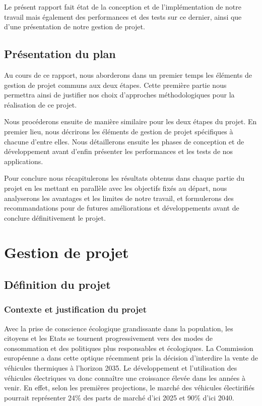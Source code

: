 \documentclass[a4paper, 12pt]{report}
\begin{document}
\bigskip
Le présent rapport fait état de la conception et de l'implémentation de notre travail mais également des performances et des tests sur ce dernier, ainsi que d'une présentation de notre gestion de projet.

\section{Présentation du plan}

Au cours de ce rapport, nous aborderons dans un premier temps les éléments de gestion de projet communs aux deux étapes. Cette première partie nous permettra ainsi de justifier nos choix d'approches méthodologiques pour la réalisation de ce projet.
\bigskip

Nous procéderons ensuite de manière similaire pour les deux étapes du projet. En premier lieu, nous décrirons les éléments de gestion de projet spécifiques à chacune d'entre elles. Nous détaillerons ensuite les phases de conception et de développement avant d'enfin présenter les performances et les tests de nos applications.
\bigskip


Pour conclure nous récapitulerons les résultats obtenus dans chaque partie du projet en les mettant en parallèle avec les objectifs fixés au départ, nous analyserons les avantages et les limites de notre travail, et formulerons des recommandations pour de futures améliorations et développements avant de conclure définitivement le projet.


\chapter{Gestion de projet}
\minitoc
{}
\clearpage
\section{Définition du projet}

\subsection{Contexte et justification du projet}

Avec la prise de conscience écologique grandissante dans la population, les citoyens et les Etats se tournent progressivement vers des modes de consommation et des politiques plus responsables et écologiques. La Commission européenne a dans cette optique récemment pris la décision d'interdire la vente de véhicules thermiques à l'horizon 2035. Le développement et l'utilisation des véhicules électriques va donc connaître une croissance élevée dans les années à venir. En effet, selon les premières projections\footnotemark[1], le marché des véhicules électirifiés pourrait représenter 24\% des parts de marché d'ici 2025 et 90\% d'ici 2040.
\bigskip
{}
\end{document}
